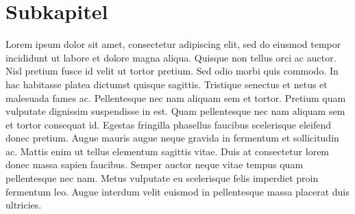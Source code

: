 \section{Subkapitel}
Lorem ipsum dolor sit amet, consectetur adipiscing elit, sed do eiusmod tempor incididunt ut labore et dolore magna aliqua. Quisque non tellus orci ac auctor. Nisl pretium fusce id velit ut tortor pretium. Sed odio morbi quis commodo. In hac habitasse platea dictumst quisque sagittis. Tristique senectus et netus et malesuada fames ac. Pellentesque nec nam aliquam sem et tortor. Pretium quam vulputate dignissim suspendisse in est. Quam pellentesque nec nam aliquam sem et tortor consequat id. Egestas fringilla phasellus faucibus scelerisque eleifend donec pretium. Augue mauris augue neque gravida in fermentum et sollicitudin ac. Mattis enim ut tellus elementum sagittis vitae. Duis at consectetur lorem donec massa sapien faucibus. Semper auctor neque vitae tempus quam pellentesque nec nam. Metus vulputate eu scelerisque felis imperdiet proin fermentum leo. Augue interdum velit euismod in pellentesque massa placerat duis ultricies.

